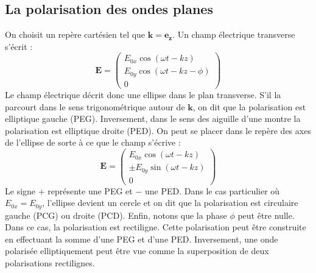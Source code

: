 \subsection{La polarisation des ondes planes}
\label{sec:circpolar}
On choisit un repère cartésien tel que $\bm{k}=\bm{e_z}$. Un champ électrique transverse s'écrit :
\begin{equation*}
\bm{E}=\begin{pmatrix}
E_{0x}\cos{(\omega t-kz)}\\
E_{0y}\cos{(\omega t-kz-\phi)}\\
0
\end{pmatrix}
\end{equation*}
Le champ électrique décrit donc une ellipse dans le plan transverse. S'il la parcourt dans le sens trigonométrique autour de $\bm{k}$, on dit que la polarisation est elliptique gauche (PEG). Inversement, dans le sens des aiguille d'une montre la polarisation est elliptique droite (PED). On peut se placer dans le repère des axes de l'ellipse de sorte à ce que le champ s'écrive :
\begin{equation*}
\bm{E}=\begin{pmatrix}
E_{0x}\cos{(\omega t-kz)}\\
\pm E_{0y}\sin{(\omega t-kz)}\\
0
\end{pmatrix}
\end{equation*}
Le signe $+$ représente une PEG et $-$ une PED. Dans le cas particulier où $E_{0x}=E_{0y}$, l'ellipse devient un cercle et on dit que la polarisation est circulaire gauche (PCG) ou droite (PCD). Enfin, notons que la phase $\phi$ peut être nulle. Dans ce cas, la polarisation est rectiligne. Cette polarisation peut être construite en effectuant la somme d'une PEG et d'une PED. Inversement, une onde polarisée elliptiquement peut être vue comme la superposition de deux polarisations rectilignes.


